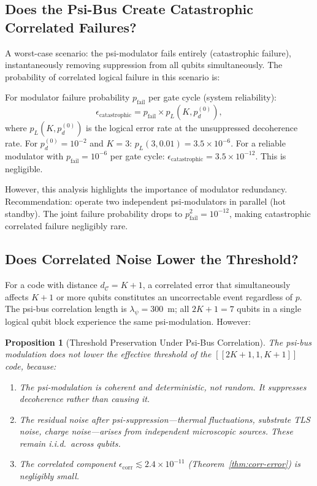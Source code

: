 \documentclass[11pt]{article}
\newtheorem{proposition}[theorem]{Proposition}
\theoremstyle{definition}
\theoremstyle{remark}
\begin{document}
\subsection{Does the Psi-Bus Create Catastrophic Correlated Failures?}
\label{sec:catastrophic}

A worst-case scenario: the psi-modulator fails entirely (catastrophic failure),
instantaneously removing suppression from all qubits simultaneously.  The
probability of correlated logical failure in this scenario is:

For modulator failure probability $p_{\mathrm{fail}}$ per gate cycle (system reliability):
\begin{equation}
  \epsilon_{\mathrm{catastrophic}} = p_{\mathrm{fail}}\times p_L(K, p_d^{(0)}),
  \label{eq:catastrophic}
\end{equation}
where $p_L(K, p_d^{(0)})$ is the logical error rate at the unsuppressed decoherence rate.
For $p_d^{(0)} = 10^{-2}$ and $K=3$: $p_L(3, 0.01) = 3.5\times10^{-6}$.
For a reliable modulator with $p_{\mathrm{fail}} = 10^{-6}$ per gate cycle:
$\epsilon_{\mathrm{catastrophic}} = 3.5\times10^{-12}$.  This is negligible.

However, this analysis highlights the importance of modulator redundancy.
Recommendation: operate two independent psi-modulators in parallel (hot standby).
The joint failure probability drops to $p_{\mathrm{fail}}^2 = 10^{-12}$,
making catastrophic correlated failure negligibly rare.

\subsection{Does Correlated Noise Lower the Threshold?}
\label{sec:corr-lower-threshold}

For a code with distance $d_{\mathcal{C}} = K+1$, a correlated error that
simultaneously affects $K+1$ or more qubits constitutes an uncorrectable event
regardless of $p$.  The psi-bus correlation length is $\lambda_\psi = 300$~m;
all $2K+1 = 7$ qubits in a single logical qubit block experience the same
psi-modulation.  However:

\begin{proposition}[Threshold Preservation Under Psi-Bus Correlation]
\label{prop:threshold-preserved}
The psi-bus modulation does not lower the effective threshold of the
$[[2K+1,1,K+1]]$ code, because:
\begin{enumerate}
  \item The psi-modulation is coherent and deterministic, not random.  It
    suppresses decoherence rather than causing it.
  \item The residual noise after psi-suppression---thermal fluctuations,
    substrate TLS noise, charge noise---arises from independent microscopic
    sources.  These remain i.i.d.\ across qubits.
  \item The correlated component $\epsilon_{\mathrm{corr}} \lesssim 2.4\times10^{-11}$
    (Theorem~\ref{thm:corr-error}) is negligibly small.
\end{enumerate}
\end{proposition}
\end{document}
